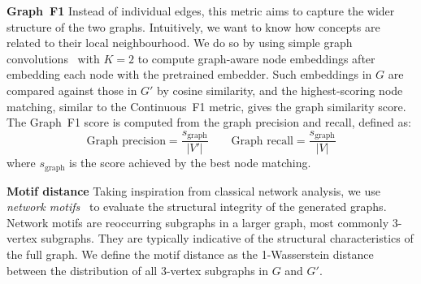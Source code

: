 \documentclass{article}
\begin{document}
\textbf{Graph~F1 }
Instead of individual edges, this metric aims to capture the wider structure of the two graphs. Intuitively, we want to know how concepts are related to their local neighbourhood. We do so by using simple graph convolutions~\cite{wu2019simplifying} with $K=2$ to compute graph-aware node embeddings after embedding each node with the pretrained embedder. Such embeddings in $G$ are compared against those in $G'$ by cosine similarity, and the highest-scoring node matching, similar to the Continuous~F1 metric, gives the graph similarity score. The Graph~F1 score is computed from the graph precision and recall, defined as:
\[
\text{Graph precision} = \frac{s_\text{graph}}{|V'|} \qquad
\text{Graph recall} = \frac{s_\text{graph}}{|V|}
\]
where $s_\text{graph}$ is the score achieved by the best node matching.

\textbf{Motif distance }
Taking inspiration from classical network analysis, we use \emph{network motifs}~\cite{milo2002network,shen2002network} to evaluate the structural integrity of the generated graphs. Network motifs are reoccurring subgraphs in a larger graph, most commonly 3-vertex subgraphs. They are typically indicative of the structural characteristics of the full graph. We define the motif distance as the 1-Wasserstein distance~\cite{Kantorovich1960MathematicalMO} between the distribution of all 3-vertex subgraphs in $G$ and $G'$.
\end{document}
